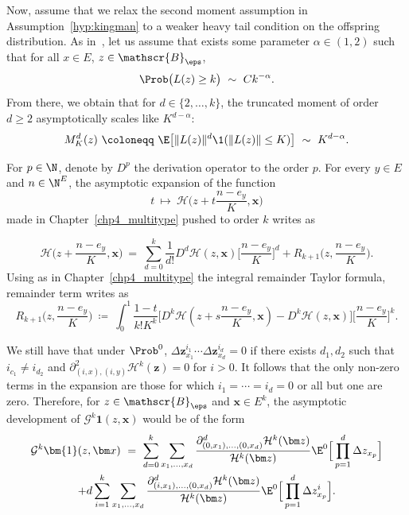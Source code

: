  Now, assume that we relax the second moment assumption in Assumption~\ref{hyp:kingman} to a weaker heavy tail condition on the offspring distribution. As in~\citet{schweinsberg2003coalescent}, let us assume that exists some parameter $\alpha\in (1,2)$ such that for all $x\in E$, $z\in \mathscr{B}_{\eps}$,
  \begin{equation}\label{eq:heavy_tail_condition}
 \Prob\big(L(z)\geq k\big)\ \sim\ Ck^{-\alpha}.
 \end{equation} 
From there, we obtain that for $d\in\{2,\ldots,k\}$, the truncated moment of order $d\geq 2$ asymptotically scales like $K^{d-\alpha}$:
  \begin{equation}\label{eq:estimation_moment_heavytail}
 M^d_K(z)\ \coloneqq\ \E\big[\lVert L(z)\rVert^d\1(\lVert L(z)\rVert\leq K)\big]\ \sim\ K^{d-\alpha}.
 \end{equation} 

 For $p\in \N$, denote by $D^p$ the derivation operator to the order $p$.
For every $y\in E$ and $n\in \N^E$, the asymptotic expansion of the function
\[
t\ \longmapsto\ \mathcal{H}\Big(z+t\frac{n-e_y}{K},\bm x\Big)
\]
made in Chapter~\ref{chp4_multitype} pushed to order $k$ writes as

\[
\mathcal{H}\Big( z+\frac{n-e_y}{K},\bm x\Big) \ =\ \sum_{d=0}^k \frac{1}{d!}D^d\mathcal{H}( z,\bm x)\Big[\frac{n-e_y}{K}\Big]^d
 + R_{k+1}\Big(z,\frac{n-e_y}{K}\Big).
\]
Using as in Chapter~\ref{chp4_multitype} the integral remainder Taylor formula, remainder term writes as
\begin{equation}\label{eq:reste_order_k}
R_{k+1}\Big(z,\frac{n-e_y}{K}\Big)\ \coloneqq\ \int_0^1\frac{1-t}{k! K^k}\Big[D^{k}\mathcal{H}(z+s \frac{n-e_y}{K}, \bm x)- D^{k}\mathcal{H}(z,\bm x)\Big]\Big[\frac{n-e_y}{K}\Big]^{k}.
\end{equation}

We still have that under $\Prob^0$, $\Delta \bm z^{i_1}_{x_1}\cdots\Delta \bm z^{i_d}_{x_d}=0$  if there exists $d_1, d_2$ such that $i_{c_1}\neq i_{d_2}$ and $\partial^2_{(i,x),(i,y)}\mathcal{H}^k(\bm z)=0$ for $i>0$. It follows that the only non-zero terms in the expansion are those for which  $i_1= \cdots = i_d=0$ or all but one are zero. Therefore, for $z\in\mathscr{B}_{\eps}$ and $\bm x\in E^k$, the asymptotic development of $\mathcal{G}^k\bm{1}(z,\bm x)$  would be of the form 
\begin{multline*}
\mathcal{G}^k\bm{1}(z, \bm x)\ =\  \sum_{d=0}^k \sum_{x_1, \ldots, x_d} \frac{\partial^d_{(0, x_1),\ldots, (0, x_d)}\mathcal{H}^k(\bm z)}{\mathcal{H}^k(\bm z)}\E^0\Big[\prod_{p=1}^d \Delta z_{x_p}\Big]  \\ + d \sum_{i=1}^k \sum_{x_1, \ldots, x_d}\frac{\partial^d_{(i, x_1),\ldots, (0, x_d)}\mathcal{H}^k(\bm z)}{\mathcal{H}^k(\bm z)} \E^0\Big[\prod_{p=1}^d \Delta z^i_{x_p}\Big]. 
\end{multline*}


